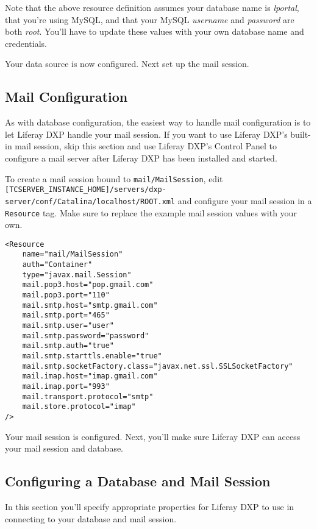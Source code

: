 Note that the above resource definition assumes your database name is
\emph{lportal}, that you're using MySQL, and that your MySQL
\emph{username} and \emph{password} are both \emph{root}. You'll have to
update these values with your own database name and credentials.

Your data source is now configured. Next set up the mail session.

\subsection{Mail Configuration}\label{mail-configuration-2}

As with database configuration, the easiest way to handle mail
configuration is to let Liferay DXP handle your mail session. If you
want to use Liferay DXP's built-in mail session, skip this section and use
Liferay DXP's Control Panel to configure a mail server after Liferay DXP
has been installed and started.

To create a mail session bound to \texttt{mail/MailSession}, edit
\texttt{{[}TCSERVER\_INSTANCE\_HOME{]}/servers/dxp-server/conf/Catalina/localhost/ROOT.xml}
and configure your mail session in a \texttt{Resource} tag. Make sure to
replace the example mail session values with your own.

\begin{verbatim}
<Resource
    name="mail/MailSession"
    auth="Container"
    type="javax.mail.Session"
    mail.pop3.host="pop.gmail.com"
    mail.pop3.port="110"
    mail.smtp.host="smtp.gmail.com"
    mail.smtp.port="465"
    mail.smtp.user="user"
    mail.smtp.password="password"
    mail.smtp.auth="true"
    mail.smtp.starttls.enable="true"
    mail.smtp.socketFactory.class="javax.net.ssl.SSLSocketFactory"
    mail.imap.host="imap.gmail.com"
    mail.imap.port="993"
    mail.transport.protocol="smtp"
    mail.store.protocol="imap"
/>
\end{verbatim}

Your mail session is configured. Next, you'll make sure Liferay DXP can
access your mail session and database.

\subsection{Configuring a Database and Mail
Session}\label{configuring-a-database-and-mail-session}

In this section you'll specify appropriate properties for Liferay DXP to
use in connecting to your database and mail session.


